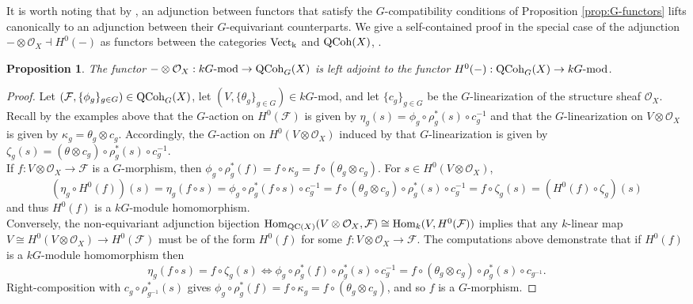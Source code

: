 \documentclass[10pt]{amsart}
\newtheorem{proposition}[theorem]{Proposition}
\theoremstyle{definition}
\begin{document}
It is worth noting that by \cite[2.19]{MR3979084}, an adjunction between functors that satisfy the $G$-compatibility conditions of Proposition \ref{prop:G-functors} lifts canonically to an adjunction between their $G$-equivariant counterparts. We give a self-contained proof in the special case of the adjunction $-\otimes\mathcal{O}_X\dashv H^0(-)$ as functors between the categories ${\rm Vect_k}$ and ${\rm QCoh}(X)$,  \cite[7.11]{MR4225278}.
\begin{proposition}\label{prop:G-adj}
The functor $-\otimes\mathcal{O}_X:kG\text{-mod}\rightarrow {\rm QCoh}_G(X)$ is left adjoint to the functor $H^0(-):{\rm QCoh}_G(X)\rightarrow kG\text{-mod}$.
\end{proposition}
\begin{proof}
Let $(\mathcal{F},\{\phi_g\}_{g\in G})\in {\rm QCoh}_G(X)$, let $(V,\{\theta_g\}_{g\in G})\in kG\text{-mod}$, and let
$\{c_g\}_{g\in G}$ be the $G$-linearization of the structure sheaf $\mathcal{O}_X$. Recall by the examples above that the $G$-action on $H^0(\mathcal{F})$ is given by $\eta_g(s)=\phi_g\circ \rho_g^*(s)\circ c_g^{-1}$ and that the $G$-linearization on $V\otimes\mathcal{O}_X$ is given by $\kappa_g=\theta_g\otimes c_g$. Accordingly, the $G$-action on $H^0(V\otimes \mathcal{O}_X)$ induced by that $G$-linearization is given by $\zeta_g(s)=(\theta\otimes c_g)\circ \rho_g^*(s)\circ c_g^{-1}$.\\


If $f:V\otimes\mathcal{O}_X\rightarrow \mathcal{F}$ is a $G$-morphism, then $\phi_g\circ\rho_g^*(f)=f\circ\kappa_g=f\circ(\theta_g\otimes c_g)$. For $s\in H^0(V\otimes \mathcal{O}_X)$,
\[
(\eta_g\circ H^0(f))(s)
=\eta_g(f\circ s)=\phi_g\circ \rho_g^*(f\circ s)\circ c_g^{-1}
=f\circ(\theta_g\otimes c_g)\circ\rho_g^*(s)\circ c_g^{-1}=f\circ\zeta_g(s)=(H^0(f)\circ\zeta_g)(s)
\]
and thus $H^0(f)$ is a $kG$-module homomorphism.\\

Conversely, the non-equivariant adjunction bijection ${\rm Hom}_{{\rm QC}(X)}(V\otimes \mathcal{O}_X,\mathcal{F})\cong{\rm Hom}_k(V,H^0(\mathcal{F}))$ implies that any $k$-linear map $V\cong H^0(V\otimes\mathcal{O}_X)\rightarrow H^0(\mathcal{F})$ must be of the form $H^0(f)$ for some $f:V\otimes\mathcal{O}_X\rightarrow \mathcal{F}$. The computations above demonstrate that if $H^0(f)$ is a $kG$-module homomorphism then 
\[
\eta_g(f\circ s)=f\circ\zeta_g(s)\Leftrightarrow
\phi_g\circ \rho_g^*(f)\circ\rho_g^*(s)\circ c_g^{-1}=f\circ(\theta_g\otimes c_g)\circ\rho_g^*(s)\circ c_{g^{-1}}.
\]
Right-composition with $c_g\circ\rho^*_{g^{-1}}(s)$ gives $\phi_g\circ\rho_g^*(f)=f\circ\kappa_g=f\circ(\theta_g\otimes c_g)$, and so $f$ is a $G$-morphism.
\end{proof}
\end{document}

